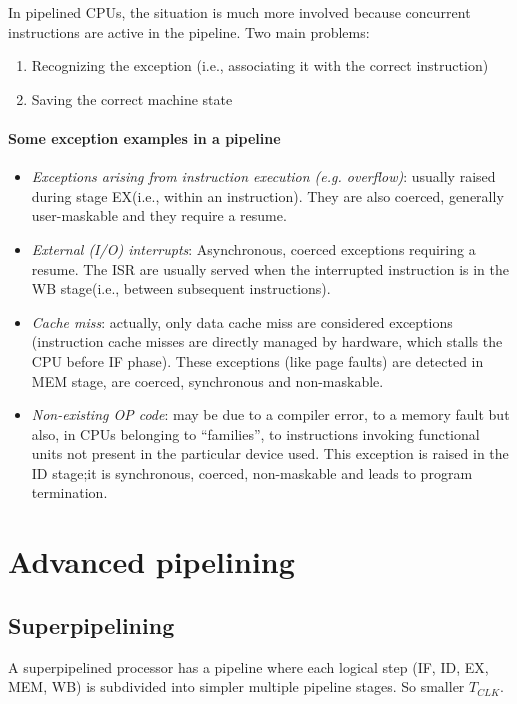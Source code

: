 In pipelined CPUs, the situation is much more involved because concurrent instructions are active in the pipeline. Two main problems:
\begin{enumerate}
    \item Recognizing the exception (i.e., associating it with the correct instruction)
    \item Saving the correct machine state
\end{enumerate}

\paragraph{Some exception examples in a pipeline}

\begin{itemize}
    \item \textit{Exceptions arising from instruction execution (e.g. overflow)}: usually raised during stage EX(i.e., within an instruction). They are also coerced, generally user-maskable and they require a resume. 
    \item \textit{External (I/O) interrupts}: Asynchronous, coerced exceptions requiring a resume. The ISR are usually served when the interrupted instruction is in the WB stage(i.e., between subsequent instructions).
    \item \textit{Cache miss}: actually, only data cache miss are considered exceptions (instruction cache misses are directly managed by hardware, which stalls the CPU before IF phase). These exceptions (like page faults) are detected in MEM stage, are coerced, synchronous and non-maskable.
    \item \textit{Non-existing OP code}: may be due to a compiler error, to a memory fault but also, in CPUs belonging to “families”, to instructions invoking functional units not present in the particular device used. This exception is raised in the ID stage;it is synchronous, coerced, non-maskable and leads to program termination.
\end{itemize}

\section{Advanced pipelining}
\subsection{Superpipelining}
A superpipelined processor has a pipeline where each logical step (IF, ID, EX, MEM, WB) is subdivided into simpler multiple pipeline stages. So smaller $T_{CLK}$.

